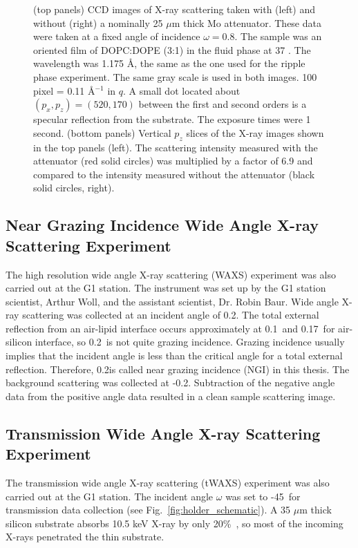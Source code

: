 \begin{figure}[jtbp]
  \caption{(top panels) CCD images of X-ray scattering taken with (left) and without 
  (right) a nominally 25 $\mu$m thick Mo attenuator. These data were taken 
  at a fixed angle of incidence $\omega=0.8$\textdegree. The sample was an oriented film of 
  DOPC:DOPE (3:1) in the fluid phase at 37 \textcelsius. The wavelength
  was 1.175 \AA, the same as the one used for the ripple phase experiment.
  The same gray scale is used in both images. 100 pixel =  0.11 \AA$^{-1}$ in $q$. 
  A small dot located about $(p_x,p_z)=(520,170)$ between the first and second orders is 
  a specular reflection from the substrate. The exposure times were 1 second. 
  (bottom panels) Vertical $p_z$ slices of the X-ray images shown in the top panels (left).
  The scattering intensity measured with the attenuator (red solid circles) 
  was multiplied by a factor of 6.9 and compared to the intensity measured 
  without the attenuator (black solid circles, right).}
  \label{fig:olddopc}
\end{figure}

\subsection{Near Grazing Incidence Wide Angle X-ray Scattering Experiment}\label{sec:nGIWAXS_method}
The high resolution wide angle X-ray scattering (WAXS)
experiment was also carried out at the G1 station. 
The instrument was set up by the G1
station scientist, Arthur Woll, and the assistant scientist, Dr. Robin Baur.
Wide angle X-ray scattering was collected at an incident angle of 0.2\textdegree. 
The total external reflection from an air-lipid interface occurs approximately 
at 0.1\textdegree\ and 0.17\textdegree\ for air-silicon interface, 
so 0.2\textdegree\ is not quite grazing incidence.
Grazing incidence usually implies that the incident angle is less than the 
critical angle for a total external reflection.
Therefore, 0.2\textdegree is called near grazing incidence (NGI) in this thesis.
The background scattering was collected at -0.2\textdegree. Subtraction
of the negative angle data from the positive angle data resulted in 
a clean sample scattering image.


\subsection{Transmission Wide Angle X-ray Scattering Experiment}\label{sec:tWAXS_method}
The transmission wide angle X-ray scattering (tWAXS) experiment was also 
carried out at the G1 station.
The incident angle $\omega$ was set to -45\textdegree\ for transmission data
collection (see Fig.~\ref{fig:holder_schematic}). 
A 35 $\mu$m thick silicon substrate absorbs 10.5 keV X-ray 
by only 20\%\ \cite{ref:cxro}, so most of the incoming X-rays penetrated
the thin substrate. 
 

